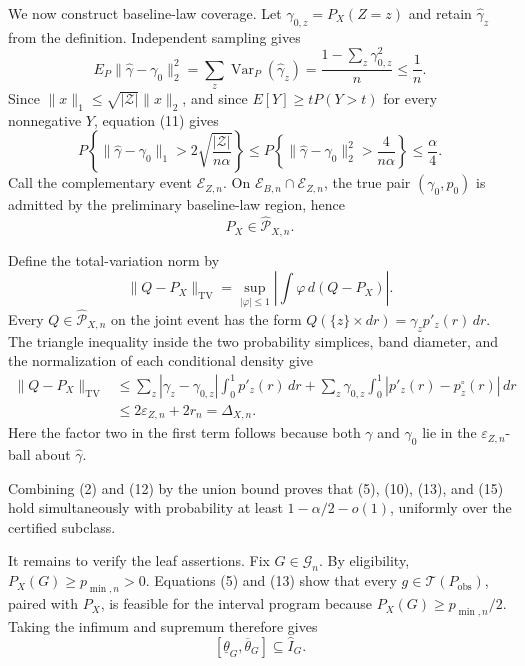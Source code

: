 We now construct baseline-law coverage.  Let \(\gamma_{0,z}=P_X(Z=z)\) and retain \(\widehat\gamma_z\) from the definition.  Independent sampling gives
\[
E_P\|\widehat\gamma-\gamma_0\|_2^2
=\sum_z\operatorname{Var}_P(\widehat\gamma_z)
=\frac{1-\sum_z\gamma_{0,z}^2}{n}
\leq\frac1n.
\tag{11}
\]
Since \(\|x\|_1\leq\sqrt{|\mathcal Z|}\|x\|_2\), and since \(E[Y]\geq tP(Y>t)\) for every nonnegative \(Y\), equation (11) gives
\[
P\!\left\{\|\widehat\gamma-\gamma_0\|_1>
2\sqrt{\frac{|\mathcal Z|}{n\alpha}}\right\}
\leq
P\!\left\{\|\widehat\gamma-\gamma_0\|_2^2>\frac4{n\alpha}\right\}
\leq\frac\alpha4.
\tag{12}
\]
Call the complementary event \(\mathcal E_{Z,n}\).  On \(\mathcal E_{B,n}\cap\mathcal E_{Z,n}\), the true pair \((\gamma_0,p_0)\) is admitted by the preliminary baseline-law region, hence
\[
P_X\in\widehat{\mathcal P}_{X,n}.
\tag{13}
\]

Define the total-variation norm by
\[
\|Q-P_X\|_{\mathrm{TV}}
=\sup_{|\varphi|\leq1}\left|\int\varphi\,d(Q-P_X)\right|.
\tag{14}
\]
Every \(Q\in\widehat{\mathcal P}_{X,n}\) on the joint event has the form \(Q(\{z\}\times dr)=\gamma_zp'_z(r)\,dr\).  The triangle inequality inside the two probability simplices, band diameter, and the normalization of each conditional density give
\[
\begin{aligned}
\|Q-P_X\|_{\mathrm{TV}}
&\leq\sum_z|\gamma_z-\gamma_{0,z}|\int_0^1p'_z(r)\,dr
+\sum_z\gamma_{0,z}\int_0^1|p'_z(r)-p^\circ_z(r)|\,dr\\
&\leq2\varepsilon_{Z,n}+2r_n
=\Delta_{X,n}.
\end{aligned}
\tag{15}
\]
Here the factor two in the first term follows because both \(\gamma\) and \(\gamma_0\) lie in the \(\varepsilon_{Z,n}\)-ball about \(\widehat\gamma\).

Combining (2) and (12) by the union bound proves that (5), (10), (13), and (15) hold simultaneously with probability at least \(1-\alpha/2-o(1)\), uniformly over the certified subclass.

It remains to verify the leaf assertions.  Fix \(G\in\mathcal G_n\).  By eligibility, \(P_X(G)\geq p_{\min,n}>0\).  Equations (5) and (13) show that every \(g\in\mathcal T(P_{\mathrm{obs}})\), paired with \(P_X\), is feasible for the interval program because \(P_X(G)\geq p_{\min,n}/2\).  Taking the infimum and supremum therefore gives
\[
[\underline\theta_G,\overline\theta_G]\subseteq\widehat I_G.
\tag{16}
\]


